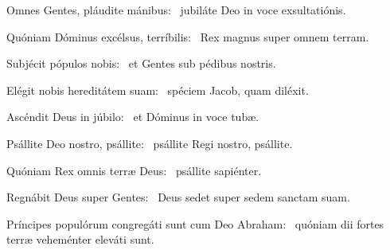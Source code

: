\item Omnes Gentes, pláudite mánibus:~\psstar{} jubiláte Deo in voce exsultatiónis.

\item Quóniam Dóminus excélsus, terríbilis:~\psstar{} Rex magnus super omnem terram.

\item Subjécit pópulos nobis:~\psstar{} et Gentes sub pédibus nostris.

\item Elégit nobis hereditátem suam:~\psstar{} spéciem Jacob, quam diléxit.

\item Ascéndit Deus in júbilo:~\psstar{} et Dóminus in voce tubæ.

\item Psállite Deo nostro, psállite:~\psstar{} psállite Regi nostro, psállite.

\item Quóniam Rex omnis terræ Deus:~\psstar{} psállite sapiénter.

\item Regnábit Deus super Gentes:~\psstar{} Deus sedet super sedem sanctam suam.

\item Príncipes populórum congre\-gáti sunt cum Deo Abraham:~\psstar{} quóniam dii fortes terræ veheménter eleváti sunt.
